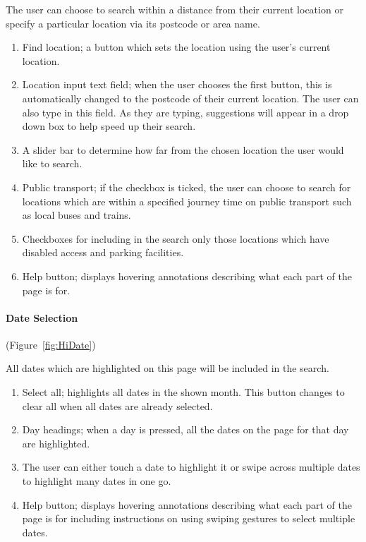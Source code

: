 The user can choose to search within a distance from their current
location or specify a particular location via its postcode or area
name.
\begin{enumerate}
	\item Find location; a button which sets the location using the user's
		current location.
	\item Location input text field; when the user chooses the first button,
		this is automatically changed to the postcode of their current
		location.  The user can also type in this field. As they are typing,
		suggestions will appear in a drop down box to help speed up their
		search.
	\item A slider bar to determine how far from the chosen location the user
		would like to search.
	\item Public transport; if the checkbox is ticked, the user can choose
		to search for locations which are within a specified journey time
		on public transport such as local buses and trains.
	\item Checkboxes for including in the search only those locations which
		have disabled access and parking facilities.
	\item Help button; displays hovering annotations describing what each part
		of the page is for.
\end{enumerate}

\paragraph{Date Selection} (Figure~\ref{fig:HiDate})


All dates which are highlighted on this page will be included in the
search.
\begin{enumerate}
	\item Select all; highlights all dates in the shown month. This button
		changes to clear all when all dates are already selected.
	\item Day headings; when a day is pressed, all the dates on the page for
		that day are highlighted.
	\item The user can either touch a date to highlight it or swipe across multiple
		dates to highlight many dates in one go.
	\item Help button; displays hovering annotations describing what each part
		of the page is for including instructions on using swiping gestures
		to select multiple dates.
\end{enumerate}

